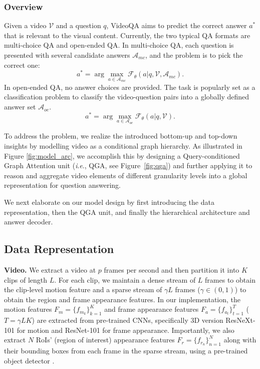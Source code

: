 \documentclass[letterpaper]{article} \usepackage{aaai21}  \usepackage{times}  \usepackage{helvet} \usepackage{courier}  \usepackage[hyphens]{url}  \usepackage{graphicx} \urlstyle{rm} \def\UrlFont{\rm}  \usepackage{natbib}  \usepackage{caption} \usepackage{color, colortbl}
\newcommand{\ie}{\textit{i}.\textit{e}.}
\begin{document}
\subsubsection{Overview}
Given a video $\mathcal{V}$ and a question $q$, VideoQA aims to predict the correct answer $a^*$ that is relevant to the visual content. Currently, the two typical QA formats are multi-choice QA and open-ended QA. In multi-choice QA, each question is presented with several candidate answers $\mathcal{A}_{mc}$, and the problem is to pick the correct one:
\begin{equation}
    a^* = \arg\max_{a \in \mathcal{A}_{mc}} {\mathcal{F}_{\theta}(a | q, \mathcal{V}, \mathcal{A}_{mc})}.
\end{equation}
In open-ended QA, no answer choices are provided. The task is popularly set as a classification problem to classify the video-question pairs into a globally defined answer set $\mathcal{A}_{oe}$.
\begin{equation}
    a^* = \arg\max_{a \in \mathcal{A}_{oe}} {\mathcal{F}_{\theta}(a | q, \mathcal{V})}.
\end{equation}

To address the problem, we realize the introduced bottom-up and top-down insights by modelling video as a conditional graph hierarchy. As illustrated in Figure \ref{fig:model_arc}, we accomplish this by designing a Query-conditioned Graph Attention unit (\ie, QGA, see Figure~\ref{fig:qga}) and further applying it to reason and aggregate video elements of different granularity levels into a global representation for question answering.

We next elaborate on our model design by first introducing the data representation, then the QGA unit, and finally the hierarchical architecture and answer decoder. 

\subsection{Data Representation}
\textbf{Video.}
We extract a video at $p$ frames per second and then partition it into $K$ clips of length $L$. For each clip, we maintain a dense stream of $L$ frames to obtain the clip-level motion feature and a sparse stream of $\gamma L$ frames ($\gamma \in (0, 1)$) to obtain the region and frame appearance features. In our implementation, the motion features $F_m=\{f_{m_k}\}_{k=1}^K$ and frame appearance features $F_a=\{f_{a_t}\}_{t=1}^T$ ($T=\gamma LK$) are extracted from pre-trained CNNs, specifically 3D version ResNeXt-101 \cite{hara2018can} for motion and ResNet-101 \cite{he2016deep} for frame appearance. Importantly, we also extract $N$ RoIs' (region of interest) appearance features $F_r=\{f_{r_n}\}_{n=1}^N$ along with their bounding boxes from each frame in the sparse stream, using a pre-trained object detector \cite{anderson2018bottom}.
\end{document}
